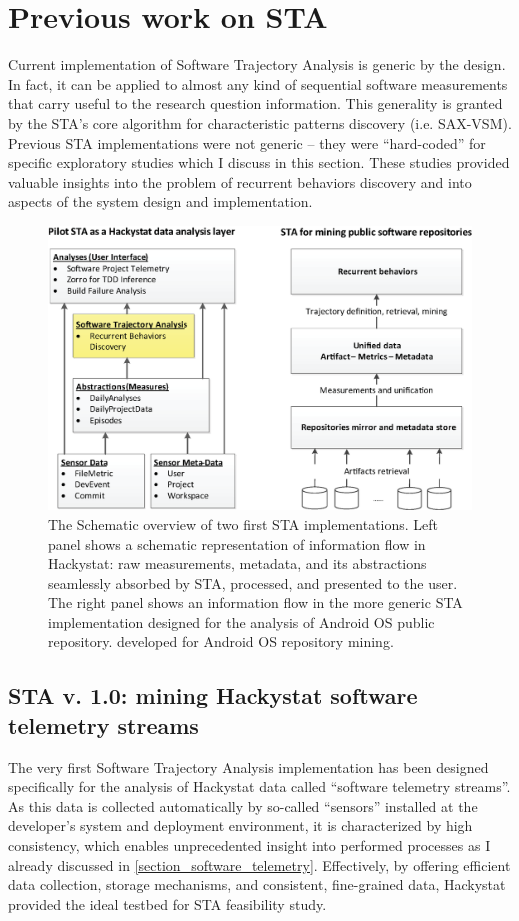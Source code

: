 \section{Previous work on STA}
Current implementation of Software Trajectory Analysis is generic by the design. In fact, it can be applied 
to almost any kind of sequential software measurements that carry useful to the research question information. 
This generality is granted by the STA's core algorithm for characteristic patterns discovery (i.e. SAX-VSM). 
Previous STA implementations were not generic -- they were ``hard-coded'' for specific exploratory studies 
which I discuss in this section. These studies provided valuable insights into the problem of recurrent 
behaviors discovery and into aspects of the system design and implementation.

\begin{figure}[t]
   \centering
   \includegraphics[width=150mm]{figures/STA12-schema-draft.eps}
   \caption{The Schematic overview of two first STA implementations. 
   Left panel shows a schematic representation of information flow in Hackystat: raw measurements, metadata, and its 
   abstractions seamlessly absorbed by STA, processed, and presented to the user.
   The right panel shows an information flow in the more generic STA implementation designed for the analysis of 
   Android OS public repository. developed for Android OS repository mining.}
   \label{fig:STA12-schema}
\end{figure}

\subsection{STA v. 1.0: mining Hackystat software telemetry streams}
The very first Software Trajectory Analysis implementation has been designed specifically for the analysis of Hackystat 
data called ``software telemetry streams''. As this data is collected automatically by so-called ``sensors'' installed 
at the developer's system and deployment environment, it is characterized by high consistency, which enables 
unprecedented insight into performed processes as I already discussed in \ref{section_software_telemetry}. 
Effectively, by offering efficient data collection, storage mechanisms, and consistent, fine-grained data, 
Hackystat provided the ideal testbed for STA feasibility study.


